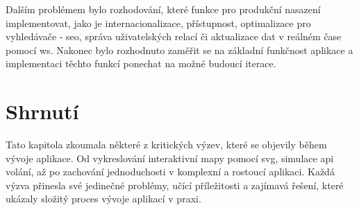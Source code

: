 Dalším problémem bylo rozhodování, které funkce pro produkční nasazení implementovat, jako je internacionalizace, přístupnost, optimalizace pro vyhledávače - \ac{seo}, správa uživatelských relací či aktualizace dat v reálném čase pomocí \ac{ws}\cite{mdn_api_websockets_api}.
Nakonec bylo rozhodnuto zaměřit se na základní funkčnost aplikace a implementaci těchto funkcí ponechat na možné budoucí iterace.

\section{Shrnutí}
\label{sec:vyzvy-a-problemy-shrnuti}
Tato kapitola zkoumala některé z kritických výzev, které se objevily během vývoje aplikace.
Od vykreslování interaktivní mapy pomocí \ac{svg}, simulace \ac{api} volání, až po zachování jednoduchosti v komplexní a rostoucí aplikaci.
Každá výzva přinesla své jedinečné problémy, učící příležitosti a zajímavá řešení, které ukázaly složitý proces vývoje aplikací v praxi.

